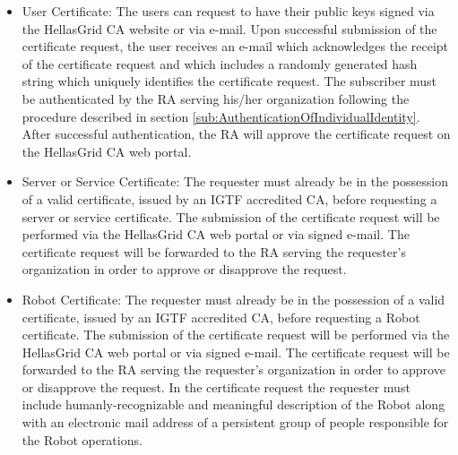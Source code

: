 \begin{itemize}
\item{User Certificate: The users can request to have their public keys signed via the HellasGrid CA website or via e-mail. Upon successful submission of the certificate request, the user receives an e-mail which acknowledges the receipt of the certificate request and which includes a randomly generated hash string which uniquely identifies the certificate request. The subscriber must be authenticated by the RA serving his/her organization following the procedure described in section \ref{sub:AuthenticationOfIndividualIdentity}. After successful authentication, the RA will approve the certificate request on the HellasGrid CA web portal.}

\item{Server or Service Certificate: The requester must already be in the possession of a valid certificate, issued by an IGTF accredited CA, before requesting a server or service certificate. The submission of the certificate request will be performed via the HellasGrid CA web portal or via signed e-mail. The certificate request will be forwarded to the RA serving the requester's organization in order to approve or disapprove the request.}

\item{Robot Certificate: The requester must already be in the possession of a valid certificate, issued by an IGTF accredited CA, before requesting a Robot certificate. The submission of the certificate request will be performed via the HellasGrid CA web portal or via signed e-mail. The certificate request will be forwarded to the RA serving the requester's organization in order to approve or disapprove the request. In the certificate request the requester must include humanly-recognizable and meaningful description of the Robot along with an electronic mail address of a persistent group of people responsible for the Robot operations.}
\end{itemize}




